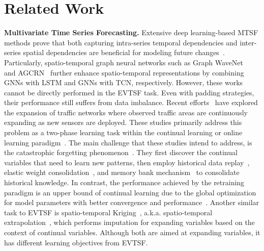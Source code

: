 \section{Related Work}
\textbf{Multivariate Time Series Forecasting.} Extensive deep learning-based MTSF methods prove that both capturing intra-series temporal dependencies and inter-series spatial dependencies are beneficial for modeling future changes~\cite{zhang2017deep, shi2015convolutional, liu2023itransformer, NEURIPS2023_dc1e32dd}. Particularly, spatio-temporal graph neural networks such as Graph WaveNet~\cite{wu2019graph} and AGCRN~\cite{bai2020adaptive} further enhance spatio-temporal representations by combining GNNs with LSTM and GNNs with TCN, respectively.
However, these works cannot be directly performed in the EVTSF task. Even with padding strategies, their performance still suffers from data imbalance. Recent efforts~\cite{chen2021trafficstream, wang2023pattern} have explored the expansion of traffic networks where observed traffic areas are continuously expanding as new sensors are deployed. 
These studies primarily address this problem as a two-phase learning task within the continual learning or online learning paradigm~\cite{chen2018lifelong}. 
The main challenge that these studies intend to address, is the catastrophic forgetting phenomenon~\cite{french1999catastrophic}. They first discover the continual variables that need to learn new patterns, then employ historical data replay~\cite{rolnick2019experience}, elastic weight consolidation~\cite{kirkpatrick2017overcoming}, and memory bank mechanism~\cite{lopez2017gradient} to consolidate historical knowledge. In contrast, the performance achieved by the retraining paradigm is an upper bound of continual learning due to the global optimization for model parameters with better convergence and performance~\cite{kirkpatrick2017overcoming, rolnick2019experience}. Another similar task to EVTSF is spatio-temporal Kriging~\cite{wu2021inductive}, a.k.a. spatio-temporal extrapolation~\cite{hu2023graph}, which performs imputation for expanding variables based on the context of continual variables. Although both are aimed at expanding variables, it has different learning objectives from EVTSF.

